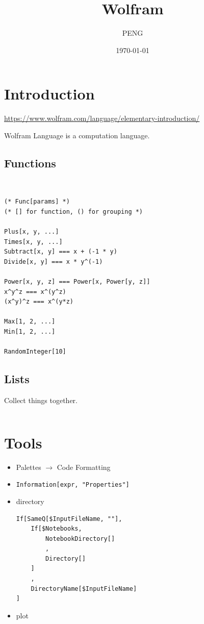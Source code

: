 \documentclass{article}
\title{Wolfram}
\author{PENG}
\date{\today}
\begin{document}
\maketitle
\tableofcontents
\section{Introduction}
\url{https://www.wolfram.com/language/elementary-introduction/}

\begin{definition}
    Wolfram Language is a computation language.
\end{definition}

\subsection{Functions}
\begin{definition}[function]~
    \begin{verbatim}
(* Func[params] *)
(* [] for function, () for grouping *)

Plus[x, y, ...]
Times[x, y, ...]
Subtract[x, y] === x + (-1 * y)
Divide[x, y] === x * y^(-1)

Power[x, y, z] === Power[x, Power[y, z]]
x^y^z === x^(y^z)
(x^y)^z === x^(y*z)

Max[1, 2, ...]
Min[1, 2, ...]

RandomInteger[10]
\end{verbatim}
\end{definition}

\subsection{Lists}
\begin{definition}[list]
    Collect things together.
    \begin{verbatim}

\end{verbatim}
\end{definition}

\appendix
\section{Tools}
\begin{itemize}
    \item Palettes $\to$ Code Formatting
    \item \verb|Information[expr, "Properties"]|
    \item directory
          \begin{verbatim}
If[SameQ[$InputFileName, ""],
    If[$Notebooks,
        NotebookDirectory[]
        ,
        Directory[]
    ]
    ,
    DirectoryName[$InputFileName]
]
\end{verbatim}
    \item plot
\end{itemize}

\printbibliography
\end{document}
